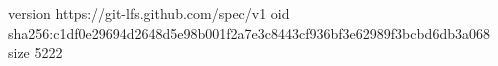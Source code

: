 version https://git-lfs.github.com/spec/v1
oid sha256:c1df0e29694d2648d5e98b001f2a7e3c8443cf936bf3e62989f3bcbd6db3a068
size 5222
